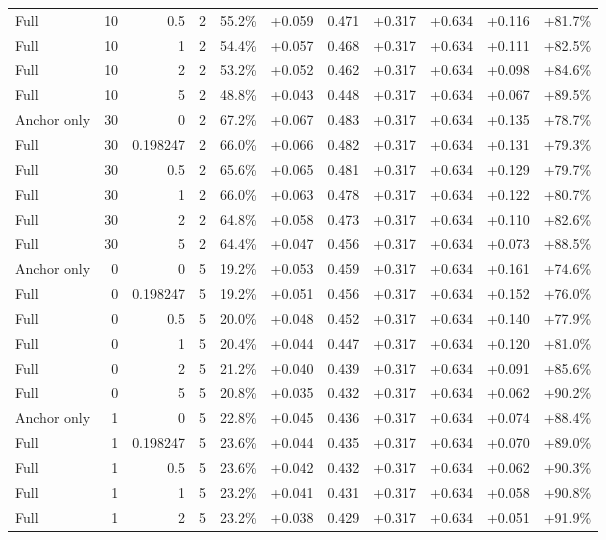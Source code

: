 \begin{table}[htbp]
\begin{tabular}{lrrrccccccc}
Full & 10 & 0.5 & 2 & 55.2\% & +0.059 & 0.471 & +0.317 & +0.634 & +0.116 & +81.7\% \\
Full & 10 & 1 & 2 & 54.4\% & +0.057 & 0.468 & +0.317 & +0.634 & +0.111 & +82.5\% \\
Full & 10 & 2 & 2 & 53.2\% & +0.052 & 0.462 & +0.317 & +0.634 & +0.098 & +84.6\% \\
Full & 10 & 5 & 2 & 48.8\% & +0.043 & 0.448 & +0.317 & +0.634 & +0.067 & +89.5\% \\
Anchor only & 30 & 0 & 2 & 67.2\% & +0.067 & 0.483 & +0.317 & +0.634 & +0.135 & +78.7\% \\
Full & 30 & 0.198247 & 2 & 66.0\% & +0.066 & 0.482 & +0.317 & +0.634 & +0.131 & +79.3\% \\
Full & 30 & 0.5 & 2 & 65.6\% & +0.065 & 0.481 & +0.317 & +0.634 & +0.129 & +79.7\% \\
Full & 30 & 1 & 2 & 66.0\% & +0.063 & 0.478 & +0.317 & +0.634 & +0.122 & +80.7\% \\
Full & 30 & 2 & 2 & 64.8\% & +0.058 & 0.473 & +0.317 & +0.634 & +0.110 & +82.6\% \\
Full & 30 & 5 & 2 & 64.4\% & +0.047 & 0.456 & +0.317 & +0.634 & +0.073 & +88.5\% \\
Anchor only & 0 & 0 & 5 & 19.2\% & +0.053 & 0.459 & +0.317 & +0.634 & +0.161 & +74.6\% \\
Full & 0 & 0.198247 & 5 & 19.2\% & +0.051 & 0.456 & +0.317 & +0.634 & +0.152 & +76.0\% \\
Full & 0 & 0.5 & 5 & 20.0\% & +0.048 & 0.452 & +0.317 & +0.634 & +0.140 & +77.9\% \\
Full & 0 & 1 & 5 & 20.4\% & +0.044 & 0.447 & +0.317 & +0.634 & +0.120 & +81.0\% \\
Full & 0 & 2 & 5 & 21.2\% & +0.040 & 0.439 & +0.317 & +0.634 & +0.091 & +85.6\% \\
Full & 0 & 5 & 5 & 20.8\% & +0.035 & 0.432 & +0.317 & +0.634 & +0.062 & +90.2\% \\
Anchor only & 1 & 0 & 5 & 22.8\% & +0.045 & 0.436 & +0.317 & +0.634 & +0.074 & +88.4\% \\
Full & 1 & 0.198247 & 5 & 23.6\% & +0.044 & 0.435 & +0.317 & +0.634 & +0.070 & +89.0\% \\
Full & 1 & 0.5 & 5 & 23.6\% & +0.042 & 0.432 & +0.317 & +0.634 & +0.062 & +90.3\% \\
Full & 1 & 1 & 5 & 23.2\% & +0.041 & 0.431 & +0.317 & +0.634 & +0.058 & +90.8\% \\
Full & 1 & 2 & 5 & 23.2\% & +0.038 & 0.429 & +0.317 & +0.634 & +0.051 & +91.9\% \\

\end{tabular}
\end{table}
